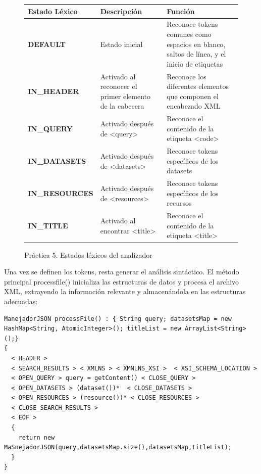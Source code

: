 \begin{figure}[H]
  \centering
  \begin{tabularx}{\textwidth}{>{\bfseries}l X X}
  \toprule
  \textbf{Estado Léxico} & \textbf{Descripción} & \textbf{Función} \\
  \midrule
  DEFAULT & Estado inicial & Reconoce tokens comunes como espacios en blanco, saltos de línea, y el inicio de etiquetas \\
  \midrule
  IN\_HEADER & Activado al reconocer el primer elemento de la cabecera & Reconoce los diferentes elementos que componen el encabezado XML \\
  \midrule
  IN\_QUERY & Activado después de \textless query\textgreater & Reconoce el contenido de la etiqueta \textless code\textgreater \\
  \midrule
  IN\_DATASETS & Activado después de \textless datasets\textgreater & Reconoce tokens específicos de los datasets \\
  \midrule
  IN\_RESOURCES & Activado después de \textless resources\textgreater & Reconoce tokens específicos de los recursos \\
  \midrule
  IN\_TITLE & Activado al encontrar \textless title\textgreater & Reconoce el contenido de la etiqueta \textless title\textgreater \\
  \bottomrule
  \end{tabularx}
  \caption{\label{fig:estadoslexicosp5}Práctica 5. Estados léxicos del analizador}
  \label{table:lexical_states}
  \end{figure}


Una vez se definen los tokens, resta generar el análisis sintáctico. El método principal processfile() inicializa las estructuras de datos y procesa el archivo XML, extrayendo la información relevante y almacenándola en las estructuras adecuadas:

\lstset{inputencoding=utf8/latin1}
\begin{lstlisting}
ManejadorJSON processFile() : { String query; datasetsMap = new HashMap<String, AtomicInteger>(); titleList = new ArrayList<String>();}
{
  < HEADER > 
  < SEARCH_RESULTS > < XMLNS > < XMNLNS_XSI >  < XSI_SCHEMA_LOCATION > 
  < OPEN_QUERY > query = getContent() < CLOSE_QUERY > 
  < OPEN_DATASETS > (dataset())*  < CLOSE_DATASETS >
  < OPEN_RESOURCES > (resource())* < CLOSE_RESOURCES >
  < CLOSE_SEARCH_RESULTS >
  < EOF >
  {
    return new MaSnejadorJSON(query,datasetsMap.size(),datasetsMap,titleList);
  }
}

\end{lstlisting}

